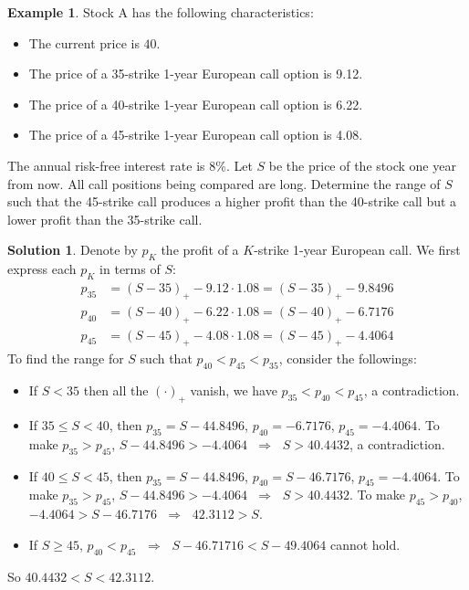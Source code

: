 \documentclass[10pt,handout]{beamer}
\newcommand{\ie}{\;\Longrightarrow\;}
\theoremstyle{definition}
\newtheorem*{ex}{Example}
\newtheorem*{sol}{Solution}
\begin{document}
\begin{frame}
  \begin{ex}
    Stock A has the following characteristics:
    \begin{itemize}
      \item The current price is $40$.
      \item The price of a 35-strike 1-year European call option is 9.12.
      \item The price of a 40-strike 1-year European call option is 6.22.
      \item The price of a 45-strike 1-year European call option is 4.08.
    \end{itemize}
    The annual risk-free interest rate is 8\%. Let $S$ be the price of the stock one year from now. All call positions being compared are long. Determine the range of $S$ such that the 45-strike call produces a higher profit than the 40-strike call but a lower profit than the 35-strike call.
  \end{ex}
\end{frame}

\begin{frame}
  \begin{sol}
    Denote by $p_K$ the profit of a $K$-strike 1-year European call. We first express each $p_K$ in terms of $S$:
    \begin{align*}
      p_{35} &= (S - 35)_+ - 9.12\cdot 1.08 = (S - 35)_+ - 9.8496 \\
      p_{40} &= (S - 40)_+ - 6.22\cdot 1.08 = (S - 40)_+ - 6.7176 \\
      p_{45} &= (S - 45)_+ - 4.08\cdot 1.08 = (S - 45)_+ - 4.4064 
    \end{align*}
    To find the range for $S$ such that $p_{40} < p_{45} < p_{35}$, consider the followings:
    \begin{itemize}
      \item If $S < 35$ then all the $(\cdot)_+$ vanish, we have $p_{35} < p_{40} < p_{45}$, a contradiction. 
      \item If $35 \leqslant S < 40$, then $p_{35} = S - 44.8496$, $p_{40} = - 6.7176$, $p_{45} = -4.4064$. To make $p_{35} > p_{45}$, $S - 44.8496 > -4.4064$ $\ie$ $S > 40.4432$, a contradiction. 
      \item If $40 \leqslant S < 45$, then $p_{35} = S - 44.8496$, $p_{40} = S - 46.7176$, $p_{45} = -4.4064$. To make $p_{35} > p_{45}$, $S - 44.8496 > -4.4064$ $\ie$ $S > 40.4432$. To make $p_{45} > p_{40}$, $-4.4064 > S - 46.7176$ $\ie$ $42.3112 > S$. 
      \item If $S\geqslant 45$, $p_{40} < p_{45}$ $\ie$ $S - 46.71716 < S - 49.4064$ cannot hold.
    \end{itemize}
    So $40.4432 < S < 42.3112$.
  \end{sol}
\end{frame}
\end{document}
